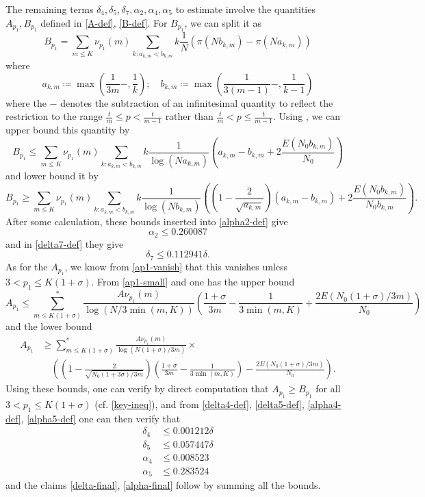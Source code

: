 \documentclass[12pt,a4paper,reqno]{amsart}
\numberwithin{equation}{section}
\theoremstyle{plain}
\theoremstyle{definition}
\begin{document}
The remaining terms $\delta_4, \delta_5, \delta_7, \alpha_2, \alpha_4, \alpha_5$ to estimate involve the quantities $A_{p_1}, B_{p_1}$ defined in \eqref{A-def}, \eqref{B-def}.  For $B_{p_1}$, we can split it as
$$ B_{p_1} = \sum_{m \leq K} \nu_{p_1}(m) \sum_{k: a_{k,m} < b_{k,m}} k \frac{1}{N} (\pi( N b_{k,m} ) - \pi(N a_{k,m}))$$
where 
$$ a_{k,m} \coloneqq \max\left( \frac{1}{3m}-, \frac{1}{k} \right); \quad b_{k,m} \coloneqq \max\left( \frac{1}{3(m-1)}-, \frac{1}{k-1} \right)$$
where the $-$ denotes the subtraction of an infinitesimal quantity to reflect the restriction to the range $\frac{t}{m} \leq p < \frac{t}{m-1}$ rather than
$\frac{t}{m} < p \leq \frac{t}{m-1}$.  Using , we can upper bound this quantity by
$$ B_{p_1} \leq \sum_{m \leq K} \nu_{p_1}(m) \sum_{k: a_{k,m} < b_{k,m}} k \frac{1}{\log(N a_{k,m})} \left( a_{k,m}-b_{k,m} + 2\frac{E(N_0 b_{k,m})}{N_0} \right)$$
and lower bound it by
$$ B_{p_1} \geq \sum_{m \leq K} \nu_{p_1}(m) \sum_{k: a_{k,m} < b_{k,m}} k \frac{1}{\log(N b_{k,m})} \left( \left(1-\frac{2}{\sqrt{a_{k,m}}}\right) (a_{k,m}-b_{k,m}) + 2\frac{E(N_0 b_{k,m})}{N_0 b_{k,m}} \right).$$
After some calculation, these bounds inserted into \eqref{alpha2-def} give
$$ \alpha_2 \leq 0.260087$$
and in \eqref{delta7-def} they give
$$ \delta_7 \leq 0.112941 \delta.$$
As for the $A_{p_1}$, we know from \eqref{ap1-vanish} that this vanishes unless $3 < p_1 \leq K(1+\sigma)$.  From \eqref{ap1-small} and  one has the upper bound
$$
A_{p_1} \leq \sum_{m \leq K(1+\sigma)}^* \frac{A \nu_{p_1}(m)}{\log(N/3\min(m,K))} \left( \frac{1+\sigma}{3m} - \frac{1}{3\min(m,K)} + \frac{2E(N_0(1+\sigma)/3m)}{N_0} \right) $$
and the lower bound
\begin{align*}
A_{p_1} &\geq \sum_{m \leq K(1+\sigma)}^* \frac{A \nu_{p_1}(m)}{\log(N(1+\sigma)/3m)} \times \\
& \quad \left( \left(1-\frac{2}{\sqrt{N_0(1+3\sigma)/3m}}\right) \left(\frac{1+\sigma}{3m} - \frac{1}{3\min(m,K)}\right) - \frac{2E(N_0(1+\sigma)/3m)}{N_0} \right).
\end{align*}
Using these bounds, one can verify by direct computation that $A_{p_1} \geq B_{p_1}$ for all $3 < p_1 \leq K(1+\sigma)$ (cf. \eqref{key-ineq}), and from \eqref{delta4-def}, \eqref{delta5-def}, \eqref{alpha4-def}, \eqref{alpha5-def} one can then verify that
\begin{align*}
\delta_4 &\leq 0.001212 \delta \\
\delta_5 &\leq 0.057447 \delta \\
\alpha_4 &\leq 0.008523 \\
\alpha_5 &\leq 0.283524
\end{align*}
and the claims \eqref{delta-final}, \eqref{alpha-final} follow by summing all the bounds.
\end{document}

